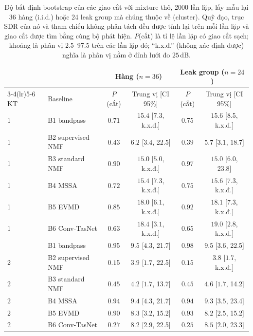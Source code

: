 \documentclass[11pt]{article}
\begin{document}
\begin{table}[H]
\centering
\caption{Độ bất định bootstrap của các giao cắt với mixture thô, 2000 lần lặp, lấy mẫu lại 36 hàng (i.i.d.) hoặc 24 leak group mà chúng thuộc về (cluster). Quỹ đạo, trục SDR của nó và tham chiếu không-phân-tách đều được tính lại trên mỗi lần lặp và giao cắt được tìm bằng cùng bộ phát hiện. $P$(cắt) là tỉ lệ lần lặp có giao cắt sạch; khoảng là phân vị 2.5--97.5 trên các lần lặp đó; ``k.x.đ.'' (không xác định được) nghĩa là phân vị nằm ở đỉnh lưới đo $25$\,dB.}
\label{tab:kneeboot}
\small
\begin{tabular}{@{}llcccc@{}}
\toprule
 & & \multicolumn{2}{c}{Hàng ($n{=}36$)} & \multicolumn{2}{c}{Leak group ($n{=}24$)} \\
\cmidrule(lr){3-4}\cmidrule(lr){5-6}
KT & Baseline & $P$(cắt) & Trung vị [CI 95\%] & $P$(cắt) & Trung vị [CI 95\%] \\
\midrule
1 & B1 bandpass        & $0.71$ & $15.4$ [$7.3$, k.x.đ.] & $0.75$ & $15.6$ [$8.5$, k.x.đ.] \\
1 & B2 supervised NMF  & $0.43$ & $6.2$ [$3.4$, 22.5] & $0.39$ & $5.7$ [$3.1$, 18.7] \\
1 & B3 standard NMF    & $0.90$ & $15.0$ [$5.0$, k.x.đ.] & $0.97$ & $15.0$ [$6.0$, 23.8] \\
1 & B4 MSSA            & $0.72$ & $15.4$ [$7.3$, k.x.đ.] & $0.75$ & $15.6$ [$7.3$, k.x.đ.] \\
1 & B5 EVMD            & $0.85$ & $18.0$ [$6.1$, k.x.đ.] & $0.92$ & $18.1$ [$7.3$, k.x.đ.] \\
1 & B6 Conv-TasNet     & $0.63$ & $18.4$ [$3.1$, k.x.đ.] & $0.65$ & $19.0$ [$2.8$, k.x.đ.] \\
\addlinespace
2 & B1 bandpass        & $0.95$ & $9.5$ [$4.3$, 21.7] & $0.98$ & $9.5$ [$3.6$, 22.5] \\
2 & B2 supervised NMF  & $0.15$ & $3.9$ [$1.7$, 22.5] & $0.15$ & $3.8$ [$1.7$, k.x.đ.] \\
2 & B3 standard NMF    & $0.45$ & $4.2$ [$1.7$, 13.7] & $0.45$ & $4.6$ [$1.7$, 14.2] \\
2 & B4 MSSA            & $0.94$ & $9.4$ [$4.3$, 21.7] & $0.94$ & $9.3$ [$3.5$, 23.4] \\
2 & B5 EVMD            & $0.90$ & $8.3$ [$3.2$, 15.2] & $0.93$ & $8.2$ [$2.5$, 15.2] \\
2 & B6 Conv-TasNet     & $0.27$ & $8.2$ [$2.9$, 22.5] & $0.25$ & $8.5$ [$2.0$, 23.3] \\
\bottomrule
\end{tabular}
\end{table}
\end{document}
